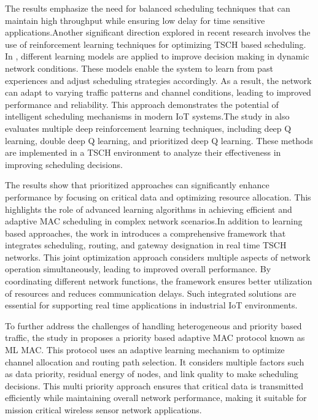 \documentclass[a4paper,fleqn]{cas-dc}
\numberwithin{equation}{section}
\begin{document}
The results emphasize the need for balanced scheduling techniques that can maintain high throughput while ensuring low delay for time sensitive applications.Another significant direction explored in recent research involves the use of reinforcement learning techniques for optimizing TSCH based scheduling. In \cite{ben2025optimizing}, different learning models are applied to improve decision making in dynamic network conditions. These models enable the system to learn from past experiences and adjust scheduling strategies accordingly. As a result, the network can adapt to varying traffic patterns and channel conditions, leading to improved performance and reliability. This approach demonstrates the potential of intelligent scheduling mechanisms in modern IoT systems.The study in \cite{ben2025optimizing} also evaluates multiple deep reinforcement learning techniques, including deep Q learning, double deep Q learning, and prioritized deep Q learning. These methods are implemented in a TSCH environment to analyze their effectiveness in improving scheduling decisions. 

The results show that prioritized approaches can significantly enhance performance by focusing on critical data and optimizing resource allocation. This highlights the role of advanced learning algorithms in achieving efficient and adaptive MAC scheduling in complex network scenarios.In addition to learning based approaches, the work in \cite{gaitan2022joint} introduces a comprehensive framework that integrates scheduling, routing, and gateway designation in real time TSCH networks. This joint optimization approach considers multiple aspects of network operation simultaneously, leading to improved overall performance. By coordinating different network functions, the framework ensures better utilization of resources and reduces communication delays. Such integrated solutions are essential for supporting real time applications in industrial IoT environments.

To further address the challenges of handling heterogeneous and priority based traffic, the study in \cite{raut2024priority} proposes a priority based adaptive MAC protocol known as ML MAC. This protocol uses an adaptive learning mechanism to optimize channel allocation and routing path selection. It considers multiple factors such as data priority, residual energy of nodes, and link quality to make scheduling decisions. This multi priority approach ensures that critical data is transmitted efficiently while maintaining overall network performance, making it suitable for mission critical wireless sensor network applications.
\end{document}
